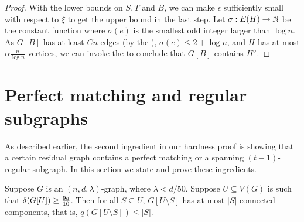 \documentclass[11pt]{article}
\begin{document}
\begin{proof}
With the lower bounds on $S,T$ and $B$, we can make $\epsilon$ sufficiently small with respect to $\xi$ to get the upper bound in the last step.
    Let $\sigma: E(H) \to \mathbb{N}$ be the constant function where $\sigma(e)$ is the smallest odd integer larger than $\log n$. 
As $G[B]$ has at least $Cn$ edges (by the ), $\sigma(e) \le 2 + \log n$, and $H$ has at most $\alpha \frac{n}{\log n}$ vertices, we can invoke the  to conclude that $G[B]$ contains $H^\sigma$.
\end{proof}

\section{Perfect matching and regular subgraphs}
\label{sec:matching-machinery}
As described earlier, the second ingredient in our hardness proof is showing that a certain residual graph contains a perfect matching or a spanning $(t-1)$-regular subgraph. In this section we state and prove these ingredients.

\begin{lemma}\label{thm:perfect-matching}
Suppose $G$ is an $(n, d, \lambda)$-graph, where $\lambda < d/50$. 
Suppose $U \subseteq V(G)$ is such that $\delta(G[U]) \ge \frac{9d}{10}$. Then for all $S \subseteq U$, $G[U \setminus S]$ has at most $|S|$ connected components, that is, $q(G[U \setminus S]) \le |S|$.
\end{lemma}
\end{document}

